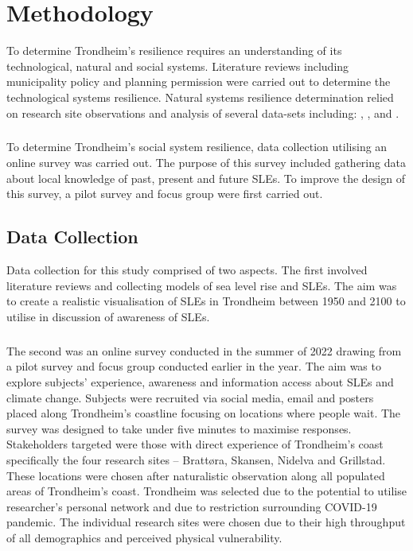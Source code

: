 
\chapter{Methodology}
To determine Trondheim's resilience requires an understanding of its technological, natural and social systems. Literature reviews including municipality policy and planning permission were carried out to determine the technological systems resilience. Natural systems resilience determination relied on research site observations and analysis of several  data-sets including: \cite{geonorge_stormflo_nodate} , \cite{kartverket_se_2021}, \cite{stormflo_database_stormflo_2021} and \cite{ipcc_sea_2021}. 
\paragraph{}
To determine Trondheim's social system resilience, data collection utilising an online survey was carried out. The purpose of this survey included gathering data about local knowledge of past, present and future SLEs. To improve the design of this survey, a pilot survey and focus group were first carried out.  

\section{Data Collection}

Data collection for this study comprised of two aspects.  The first involved literature reviews and collecting models of sea level rise and SLEs. The aim was to create a realistic visualisation of SLEs in Trondheim between 1950 and 2100 to utilise in discussion of awareness of SLEs. 
\paragraph{}

The second was an online survey conducted in the summer of 2022 drawing from a pilot survey and focus group conducted earlier in the year. The aim was to explore subjects' experience, awareness and information access about SLEs and climate change. Subjects were recruited via social media, email and posters placed along Trondheim’s coastline focusing on locations where people wait. The survey was designed to take under five minutes to maximise responses. Stakeholders targeted were those with direct experience of Trondheim’s coast specifically the four research sites – Brattøra, Skansen, Nidelva and Grillstad. These locations were chosen after naturalistic observation along all populated areas of Trondheim’s coast. Trondheim was selected due to the potential to utilise researcher's personal network and due to restriction surrounding COVID-19 pandemic. The individual research sites were chosen due to their high throughput of all demographics and perceived physical vulnerability.
